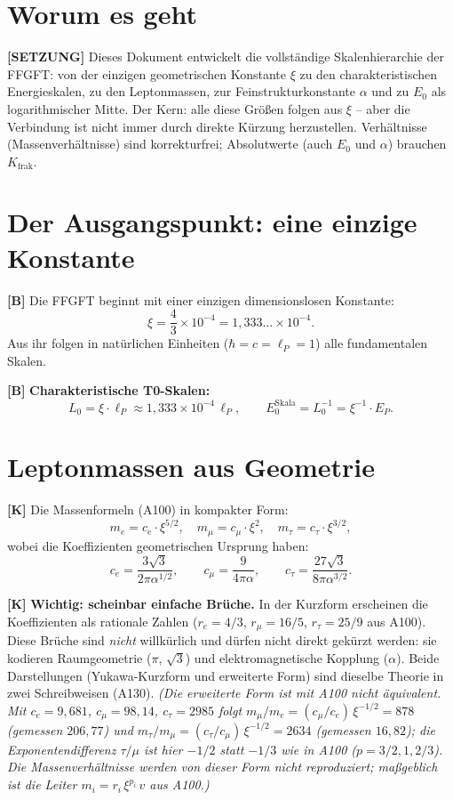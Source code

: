 \section{Worum es geht}

\textbf{[SETZUNG]} Dieses Dokument entwickelt die vollständige Skalenhierarchie der
FFGFT: von der einzigen geometrischen Konstante $\xi$ zu den charakteristischen
Energieskalen, zu den Leptonmassen, zur Feinstrukturkonstante $\alpha$ und zu $E_0$
als logarithmischer Mitte. Der Kern: alle diese Größen folgen aus $\xi$ -- aber die
Verbindung ist nicht immer durch direkte Kürzung herzustellen. Verhältnisse
(Massenverhältnisse) sind korrekturfrei; Absolutwerte (auch $E_0$ und $\alpha$) brauchen $K_\text{frak}$.

\section{Der Ausgangspunkt: eine einzige Konstante}

\textbf{[B]} Die FFGFT beginnt mit einer einzigen dimensionslosen Konstante:
\[
  \xi = \frac{4}{3}\times10^{-4} = 1{,}333\ldots\times10^{-4}.
\]
Aus ihr folgen in natürlichen Einheiten ($\hbar=c=\ell_P=1$) alle fundamentalen Skalen.

\textbf{[B]} \textbf{Charakteristische T0-Skalen:}
\[
  L_0 = \xi\cdot\ell_P \approx 1{,}333\times10^{-4}\,\ell_P,
  \qquad
  E_0^\text{Skala} = L_0^{-1} = \xi^{-1}\cdot E_P.
\]

\section{Leptonmassen aus Geometrie}

\textbf{[K]} Die Massenformeln (A100) in kompakter Form:
\[
  m_e = c_e\cdot\xi^{5/2},
  \quad
  m_\mu = c_\mu\cdot\xi^2,
  \quad
  m_\tau = c_\tau\cdot\xi^{3/2},
\]
wobei die Koeffizienten geometrischen Ursprung haben:
\[
  c_e = \frac{3\sqrt3}{2\pi\alpha^{1/2}},
  \qquad
  c_\mu = \frac{9}{4\pi\alpha},
  \qquad
  c_\tau = \frac{27\sqrt3}{8\pi\alpha^{3/2}}.
\]

\textbf{[K]} \textbf{Wichtig: scheinbar einfache Brüche.} In der Kurzform
erscheinen die Koeffizienten als rationale Zahlen ($r_e=4/3$, $r_\mu=16/5$,
$r_\tau=25/9$ aus A100). Diese Brüche sind \emph{nicht} willkürlich und dürfen
nicht direkt gekürzt werden: sie kodieren Raumgeometrie ($\pi$, $\sqrt3$) und
elektromagnetische Kopplung ($\alpha$). Beide Darstellungen (Yukawa-Kurzform
und erweiterte Form) sind dieselbe Theorie in zwei Schreibweisen (A130).
\textit{(Die erweiterte Form ist mit A100 nicht äquivalent. Mit $c_e = 9{,}681$, $c_\mu = 98{,}14$, $c_\tau = 2985$ folgt $m_\mu/m_e = (c_\mu/c_e)\,\xi^{-1/2} = 878$ (gemessen $206{,}77$) und $m_\tau/m_\mu = (c_\tau/c_\mu)\,\xi^{-1/2} = 2634$ (gemessen $16{,}82$); die Exponentendifferenz $\tau/\mu$ ist hier $-1/2$ statt $-1/3$ wie in A100 ($p = 3/2, 1, 2/3$). Die Massenverhältnisse werden von dieser Form nicht reproduziert; maßgeblich ist die Leiter $m_i = r_i\,\xi^{p_i}\,v$ aus A100.)}

